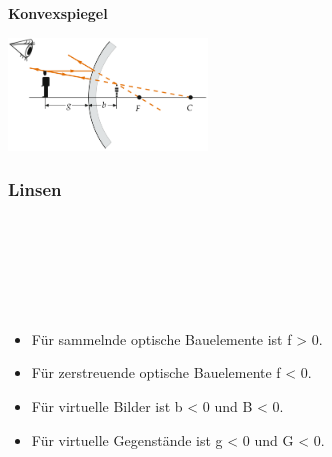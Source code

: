 \textbf{Konvexspiegel}
\begin{center}
	\includegraphics[height=3cm,keepaspectratio=true]{Images/konvexspiegel.png}
\end{center}

\subsubsection{Linsen}

\begin{center}
	\begin{minipage}{0.2\textwidth}
		 \\
		
		 \\
		 \\
		 \\
		 \\
	\end{minipage}%
	\begin{minipage}{0.4\textwidth}
		\begin{itemize}
			\setlength\itemsep{-0.5 em}
			\item Für sammelnde optische Bauelemente ist f > 0.
			\item Für zerstreuende optische Bauelemente f < 0.
			\item Für virtuelle Bilder ist b < 0 und B < 0.
			\item Für virtuelle Gegenstände ist g <	0 und G < 0.
		\end{itemize}
	\end{minipage}
\end{center}

